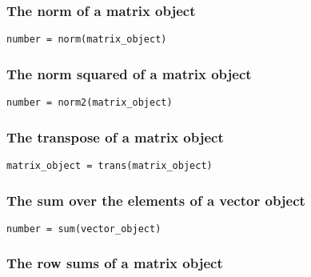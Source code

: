\subsubsection{The norm of a matrix object}

\begin{lstlisting}
number = norm(matrix_object)
\end{lstlisting}
\bigskip 


\subsubsection{The norm squared of a matrix object}

\begin{lstlisting}
number = norm2(matrix_object)
\end{lstlisting}
\bigskip 


\subsubsection{The transpose of a matrix object}

\begin{lstlisting}
matrix_object = trans(matrix_object)
\end{lstlisting}
\bigskip 


\subsubsection{The sum over the elements of a vector object}

\begin{lstlisting}
number = sum(vector_object)
\end{lstlisting}
\bigskip 


\subsubsection{The row sums of a matrix object}

